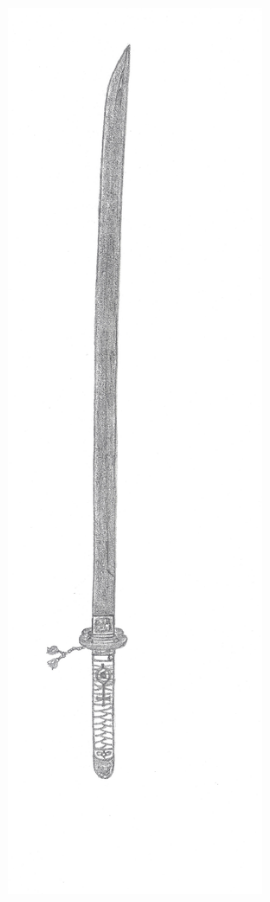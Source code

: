 \begin{figure}[b]
\begin{minipage}{0.3\linewidth}
    \centering
    \includegraphics[width=0.6\textwidth]{illustrations/rezzanjin_endurium.jpg}
    \end{minipage}
\end{figure}


